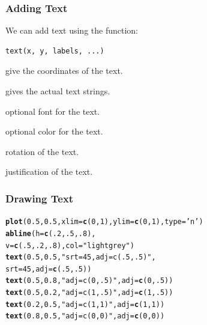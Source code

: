 \documentclass[12pt]{beamer}\usepackage[]{graphicx}\usepackage[]{color}
\makeatletter
\newcommand{\hlnum}[1]{\textcolor[rgb]{0.686,0.059,0.569}{#1}}%
\newcommand{\hlstr}[1]{\textcolor[rgb]{0.192,0.494,0.8}{#1}}%
\newcommand{\hlstd}[1]{\textcolor[rgb]{0.345,0.345,0.345}{#1}}%
\newcommand{\hlkwc}[1]{\textcolor[rgb]{0.333,0.667,0.333}{#1}}%
\newcommand{\hlkwd}[1]{\textcolor[rgb]{0.737,0.353,0.396}{\textbf{#1}}}%
\newenvironment{kframe}{%
 \def\at@end@of@kframe{}%
 \ifinner\ifhmode%
  \def\at@end@of@kframe{\end{minipage}}%
  \begin{minipage}{\columnwidth}%
 \fi\fi%
 \def\FrameCommand##1{\hskip\@totalleftmargin \hskip-\fboxsep
 \colorbox{shadecolor}{##1}\hskip-\fboxsep
     \hskip-\linewidth \hskip-\@totalleftmargin \hskip\columnwidth}%
 \MakeFramed {\advance\hsize-\width
   \@totalleftmargin\z@ \linewidth\hsize
   \@setminipage}}%
 {\par\unskip\endMakeFramed%
 \at@end@of@kframe}
\newenvironment{knitrout}{}{} %
\makeatother
\begin{document}
\begin{frame}[fragile]
\frametitle{Adding Text}

We can add text using the function:
\begin{verbatim}
text(x, y, labels, ...)
\end{verbatim}

\bi
  \item {} give the coordinates of the text.
  \item {} gives the actual text strings.
  \item {} optional font for the text.
  \item {} optional color for the text.
  \item {} rotation of the text.
  \item {} justification of the text.
\ei

\end{frame}


\begin{frame}[fragile]
\frametitle{Drawing Text}
\begin{knitrout}\footnotesize
{}\color{fgcolor}\begin{kframe}
\begin{alltt}
\hlkwd{plot}\hlstd{(}\hlnum{0.5}\hlstd{,} \hlnum{0.5}\hlstd{,} \hlkwc{xlim} \hlstd{=} \hlkwd{c}\hlstd{(}\hlnum{0}\hlstd{,} \hlnum{1}\hlstd{),} \hlkwc{ylim} \hlstd{=} \hlkwd{c}\hlstd{(}\hlnum{0}\hlstd{,} \hlnum{1}\hlstd{),} \hlkwc{type} \hlstd{=} \hlstr{'n'}\hlstd{)}
\hlkwd{abline}\hlstd{(}\hlkwc{h} \hlstd{=} \hlkwd{c}\hlstd{(}\hlnum{.2}\hlstd{,} \hlnum{.5}\hlstd{,} \hlnum{.8}\hlstd{),}
       \hlkwc{v} \hlstd{=} \hlkwd{c}\hlstd{(}\hlnum{.5}\hlstd{,} \hlnum{.2}\hlstd{,} \hlnum{.8}\hlstd{),} \hlkwc{col} \hlstd{=} \hlstr{"lightgrey"}\hlstd{)}
\hlkwd{text}\hlstd{(}\hlnum{0.5}\hlstd{,} \hlnum{0.5}\hlstd{,} \hlstr{"srt = 45, adj = c(.5, .5)"}\hlstd{,}
     \hlkwc{srt} \hlstd{=} \hlnum{45}\hlstd{,} \hlkwc{adj} \hlstd{=} \hlkwd{c}\hlstd{(}\hlnum{.5}\hlstd{,} \hlnum{.5}\hlstd{))}
\hlkwd{text}\hlstd{(}\hlnum{0.5}\hlstd{,} \hlnum{0.8}\hlstd{,} \hlstr{"adj = c(0, .5)"}\hlstd{,} \hlkwc{adj} \hlstd{=} \hlkwd{c}\hlstd{(}\hlnum{0}\hlstd{,} \hlnum{.5}\hlstd{))}
\hlkwd{text}\hlstd{(}\hlnum{0.5}\hlstd{,} \hlnum{0.2}\hlstd{,} \hlstr{"adj = c(1, .5)"}\hlstd{,} \hlkwc{adj} \hlstd{=} \hlkwd{c}\hlstd{(}\hlnum{1}\hlstd{,} \hlnum{.5}\hlstd{))}
\hlkwd{text}\hlstd{(}\hlnum{0.2}\hlstd{,} \hlnum{0.5}\hlstd{,} \hlstr{"adj = c(1, 1)"}\hlstd{,} \hlkwc{adj} \hlstd{=} \hlkwd{c}\hlstd{(}\hlnum{1}\hlstd{,} \hlnum{1}\hlstd{))}
\hlkwd{text}\hlstd{(}\hlnum{0.8}\hlstd{,} \hlnum{0.5}\hlstd{,} \hlstr{"adj = c(0, 0)"}\hlstd{,} \hlkwc{adj} \hlstd{=} \hlkwd{c}\hlstd{(}\hlnum{0}\hlstd{,} \hlnum{0}\hlstd{))}
\end{alltt}
\end{kframe}
\end{knitrout}
\end{frame}
\end{document}
